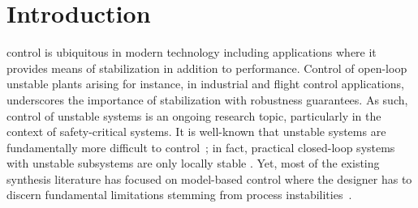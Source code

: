 \documentclass[journal]{IEEEtran}
\theoremstyle{definition}
\theoremstyle{remark}
\begin{document}
%
\IEEEpeerreviewmaketitle

\section{Introduction}
	
		
	
	
	 control is ubiquitous in modern technology including applications where it 
	provides means of stabilization in addition to performance.
	Control of open-loop unstable plants arising for instance, in industrial and flight control applications, underscores the importance of stabilization with robustness guarantees.
    As such, control of unstable systems is an ongoing research topic, particularly in the context of safety-critical systems.
	It is well-known that unstable systems are fundamentally more difficult to control~\cite{stein2003respect}; in fact, practical closed-loop systems with unstable subsystems are only locally stable \cite{sree2006control}.
	Yet, most of the existing synthesis literature has focused on model-based control where the designer has to discern fundamental limitations stemming from process instabilities~\cite{skogestad2002control}.
	
\end{document}
